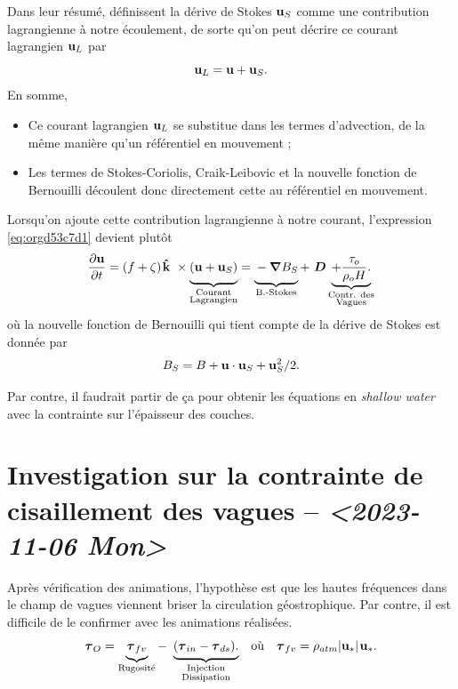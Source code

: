 \documentclass[10pt]{report}
\numberwithin{equation}{section}
\newcommand{\kvf}{\vb{\hat{k}}}
\newcommand{\uu}{\vb{u}}
\newcommand{\tall}{\vphantom{A^{x^x}_p}}
\newcommand{\grande}{\vphantom{\frac{1}{xx}}}
\newcommand{\pt}{\hspace{1pt}} %
\begin{document}
Dans leur résumé, \Textcite{suzuki2016understanding}  définissent la dérive de Stokes \(\uu_S\) comme une contribution lagrangienne à notre écoulement, de sorte qu'on peut décrire ce courant lagrangien \(\uu_L\) par
\begin{equation}
   \uu_L = \uu + \uu_S.
\end{equation}
En somme, 
\begin{itemize}
\item Ce courant lagrangien \(\uu_L\) se substitue dans les termes d'advection, de la même manière qu'un référentiel en mouvement ;
\item Les termes de Stokes-Coriolis, Craik-Leibovic et la nouvelle fonction de Bernouilli découlent donc directement cette au référentiel en mouvement. \bigskip
\end{itemize}

Lorsqu'on ajoute cette contribution lagrangienne à notre courant, l'expression \ref{eq:orgd53c7d1} devient plutôt
\begin{equation}
   \pdv{\uu}{t} = \qty(f+\zeta)\pt \kvf\ \times\underbrace{\grande\qty(\uu + \uu_S)}_{\substack{\text{Courant} \\ \text{Lagrangien}}} = \underbrace{\grande-\gradient{B_S}}_\text{B.-Stokes} + \ \boldsymbol{D} \underbrace{+ \frac{\tau_o}{\rho_o H}.}_{\substack{\text{Contr. des} \\ \text{Vagues}}}
\end{equation}
où la nouvelle fonction de Bernouilli qui tient compte de la dérive de Stokes est donnée par
\begin{align}
   B_S = B + \uu\cdot\uu_S + \uu_S^2/2.
\end{align}

Par contre, il faudrait partir de ça pour obtenir les équations en \emph{shallow water} avec la contrainte sur l'épaisseur des couches.

\section{Investigation sur la contrainte de cisaillement des vagues -- \textit{<2023-11-06 Mon>}}
\label{sec:org1735750}

Après vérification des animations, l'hypothèse est que les hautes fréquences dans le champ de vagues viennent briser la circulation géostrophique.
Par contre, il est difficile de le confirmer avec les animations réalisées.
\begin{align}
\label{eq:org40e0136}
   && \boldsymbol{\tau}_{O} = \underbrace{\tall\boldsymbol{\tau}_{fv}}_\text{Rugosité}  - \ \underbrace{(\tall\boldsymbol{\tau}_{in} - \boldsymbol{\tau}_{ds}).}_{\substack{\text{Injection} \\ \text{Dissipation}}}
   && \text{où}
   && \boldsymbol{\tau}_{fv} = \rho_{atm} \abs{\uu_*}\pt\uu_*. &&
\end{align}
\end{document}
